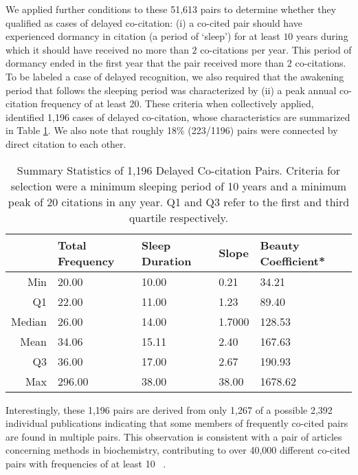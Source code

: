 \documentclass[utf8]{frontiersSCNS}
\newcommand\Tstrut{\rule{0pt}{2.9ex}} %
\begin{document}
We applied further conditions to these 51,613 pairs to determine whether they qualified as cases of delayed co-citation: (i)  a co-cited pair should have experienced dormancy in citation (a period of `sleep') for at least $10$ years during which it should have received no more than $2$ co-citations per year. This period of dormancy ended in the first year that the pair received more than $2$ co-citations. To be labeled a case of delayed recognition, we also required that the awakening period that follows the sleeping period was characterized by (ii) a peak annual co-citation frequency of at least 20. These criteria when collectively applied, identified 1,196 cases of delayed co-citation, whose characteristics are summarized in Table \ref{tab:table2}. We also note that roughly 18\% (223/1196) pairs were connected by direct citation to each other.

\begin{table}[ht]
\caption{Summary Statistics of 1,196 Delayed Co-citation Pairs. Criteria for selection were a minimum sleeping period of 10 years and a minimum peak of 20 citations in any year. Q1 and Q3 refer to the first and third quartile respectively.}%
\centering %
\begin{center}
\begin{tabular}{rllll} 
& Total Frequency & Sleep Duration & Slope & Beauty Coefficient* \\
\hline %
Min &  20.00 & 10.00 & 0.21 & 34.21   \Tstrut\\ 
Q1  &  22.00 & 11.00  & 1.23 & 89.40   \\ 
Median & 26.00 & 14.00 & 1.7000 & 128.53   \\ 
Mean & 34.06 & 15.11 & 2.40 & 167.63   \\ 
Q3 & 36.00 & 17.00 & 2.67 & 190.93   \\ 
Max & 296.00 & 38.00  & 38.00  & 1678.62   \\ 
\hline
\end{tabular}
\end{center}
\label{tab:table2} %
\end{table}

Interestingly, these 1,196 pairs are derived from only 1,267 of a possible 2,392 individual publications indicating that some members of frequently co-cited pairs are found in multiple pairs. This observation is consistent with a pair of articles concerning methods in biochemistry, contributing to over 40,000 different co-cited pairs with frequencies of at least 10 ~\citep{devarakonda_2020}.  
\end{document}
